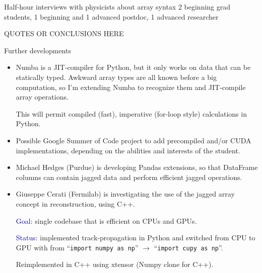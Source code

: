 \documentclass[aspectratio=169]{beamer}
\begin{document}
\begin{frame}{Half-hour interviews with physicists about array syntax}
\vspace{0.5 cm}
2 beginning grad students, 1 beginning and 1 advanced postdoc, 1 advanced researcher

\vspace{1.5 cm}
\begin{center}
\LARGE QUOTES OR CONCLUSIONS HERE
\end{center}
\end{frame}

\begin{frame}{Further developments}
\vspace{0.2 cm}
\begin{itemize}\setlength{\itemsep}{0.2 cm}
\item<1-> Numba is a JIT-compiler for Python, but it only works on data that can be statically typed. Awkward array types are all known before a big computation, so I'm extending Numba to recognize them and JIT-compile array operations.

\vspace{0.1 cm}
This will permit compiled (fast), imperative (for-loop style) calculations in Python.

\item<2-> Possible Google Summer of Code project to add precompiled and/or CUDA implementations, depending on the abilities and interests of the student.

\item<3-> Michael Hedges (Purdue) is developing Pandas extensions, so that DataFrame columns can contain jagged data and perform efficient jagged operations.

\item<4-> Giuseppe Cerati (Fermilab) is investigating the use of the jagged array concept in reconstruction, using C++.

\vspace{0.1 cm}
\textcolor{darkblue}{Goal:} single codebase that is efficient on CPUs and GPUs.

\vspace{0.1 cm}
\textcolor{darkblue}{Status:} implemented track-propagation in Python and switched from CPU to GPU with from ``{\tt \small import numpy as np}'' $\to$ ``{\tt \small import cupy as np}''.

Reimplemented in C++ using xtensor (Numpy clone for C++).
\end{itemize}
\end{frame}
\end{document}

